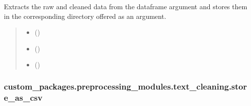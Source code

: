 \documentclass[letterpaper,10pt,english]{sphinxhowto}
\begin{document}
\begin{fulllineitems}
\label{\detokenize{_autosummary/custom_packages.preprocessing_modules.text_cleaning.store_cleaned_data_as_csv:custom_packages.preprocessing_modules.text_cleaning.store_cleaned_data_as_csv}}
\pysigstartsignatures
\pysiglinewithargsret
{}
{\sphinxparamcomma {}\sphinxparamcomma {}}
{}
\pysigstopsignatures
\sphinxAtStartPar
Extracts the raw and cleaned data from the dataframe argument and stores them in the corresponding directory offered as an argument.
\begin{quote}\begin{description}
\begin{itemize}
\item {} 
\sphinxAtStartPar
{} ()

\item {} 
\sphinxAtStartPar
{} ()

\item {} 
\sphinxAtStartPar
{} ()

\end{itemize}

\sphinxAtStartPar
{}

\end{description}\end{quote}

\end{fulllineitems}


\sphinxstepscope


\subsubsection{custom\_packages.preprocessing\_modules.text\_cleaning.store\_as\_csv}
\label{\detokenize{_autosummary/custom_packages.preprocessing_modules.text_cleaning.store_as_csv:custom-packages-preprocessing-modules-text-cleaning-store-as-csv}}\label{\detokenize{_autosummary/custom_packages.preprocessing_modules.text_cleaning.store_as_csv::doc}}
\end{document}
